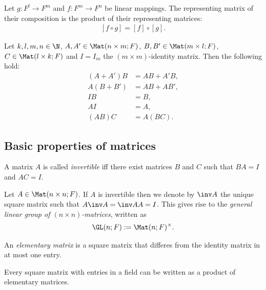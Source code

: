 \documentclass{article}
\begin{document}
\begin{theorem}[Notes 2.1.8]
	Let $g:F^l\to F^m$ and $f:F^m\to F^n$ be linear mappings. The representing matrix
	of their composition is the product of their representing matrices:
	\begin{align*}
		\left[f\circ g\right]=\left[f\right]\circ\left[g\right].
	\end{align*}
\end{theorem}

\begin{proposition}[Notes 2.1.9]
	Let $k,l,m,n\in\N$, $A,A'\in\Mat(n\times m;F)$, $B,B'\in\Mat(m\times l;F)$,
	$C\in\Mat(l\times k; F)$ and $I=I_m$ the $(m\times m)$-identity matrix.
	Then the following hold:
	\begin{align*}
		(A+A')B & = AB + A'B, \\
		A(B+B') & = AB + AB', \\
		IB      & = B,        \\
		AI      & = A,        \\
		(AB)C   & = A(BC).
	\end{align*}
\end{proposition}

\subsection{Basic properties of matrices}

\begin{definition}
	A matrix $A$ is called \emph{invertible} iff there exist matrices $B$ and $C$
	such that $BA=I$ and $AC=I$.
\end{definition}

\begin{definition}
	Let $A\in\Mat(n\times n;F)$. If $A$ is invertible then we denote by $\inv A$
	the unique square matrix such that $A\inv A=\inv AA=I$. This gives rise to the
	\emph{general linear group of $(n\times n)$-matrices}, written as
	\begin{align*}
		\GL(n;F) := \Mat(n;F)^\times.
	\end{align*}
\end{definition}

\begin{definition}
	An \emph{elementary matrix} is a square matrix that differes from the identity
	matrix in at most one entry.
\end{definition}

\begin{theorem}[Notes 2.2.3]
	Every square matrix with entries in a field can be written as a product of
	elementary matrices.
\end{theorem}
\end{document}
